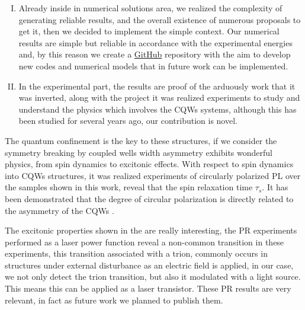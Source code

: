 \begin{enumerate}[I)]
\item Already inside in numerical solutions area, we realized the complexity of generating reliable results, and the overall existence of numerous proposals to get it, then we decided to implement the simple context. Our numerical results are simple but reliable in accordance with the experimental energies and, by this reason we create a \href{https://github.com/lflmgroup}{GitHub} repository \cite{lflmgroup} with the aim to develop new codes and numerical models that in future work can be implemented.

\item In the experimental part, the results are proof of the arduously work that it was inverted,
along with the project it was realized experiments to study and understand the physics
which involves the CQWs systems, although this has been studied for several years ago,
our contribution is novel.
\end{enumerate}


The quantum confinement is the key to these structures, if we consider the symmetry breaking by coupled wells width asymmetry exhibits wonderful physics, from spin dynamics to excitonic effects. With respect to spin dynamics into \gls{CQWs} structures, it was realized
experiments of circularly polarized PL over the samples shown in this work, reveal that the
spin relaxation time $\tau_s$. It has been demonstrated that the degree of circular polarization is directly related to the asymmetry of the \gls{CQWs} \cite{bravo2022photoluminiscence}.

The excitonic properties shown in the  are really interesting, the \gls{PR}
experiments performed as a laser power function reveal a non-common transition in these experiments, this transition associated with a trion, commonly occurs in structures under external disturbance as an electric field is applied, in our case, we not only detect the trion transition, but also it modulated with a light source. This means this can be applied as a laser transistor. These \gls{PR} results are very relevant, in fact as future work we planned
to publish them.

